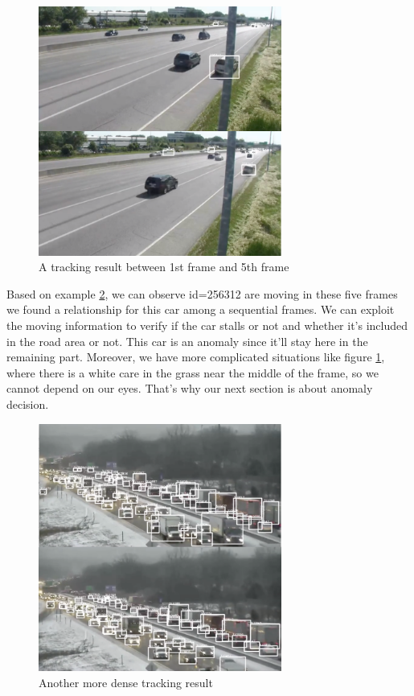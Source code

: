 \documentclass[10pt,twocolumn,letterpaper]{article}
\begin{document}
\begin{figure}  
    \includegraphics[width=8cm]{images/tracking_example1.png}
    \caption{A tracking result between 1st frame and 5th frame}
    \label{tracking_example2}
\end{figure}

Based on example \ref{tracking_example1}, we can observe id=256312 are moving in these five frames we found a relationship for this car among a sequential frames. We can exploit the moving information to verify if the car stalls or not and whether it's included in the road area or not. This car is an anomaly since it'll stay here in the remaining part. Moreover, we have more complicated situations like figure \ref{tracking_example2}, where there is a white care in the grass near the middle of the frame, so we cannot depend on our eyes. That's why our next section is about anomaly decision.

\begin{figure}  
    \includegraphics[width=8cm]{images/tracking_example2.png}
    \caption{Another more dense tracking result}
    \label{tracking_example1}
\end{figure}
\end{document}
